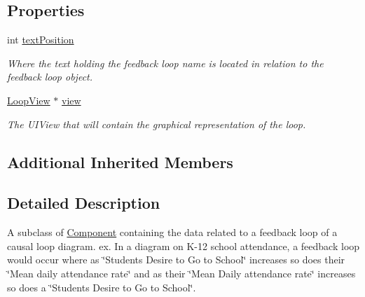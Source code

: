 \subsection*{Properties}
\begin{DoxyCompactItemize}
\item 
\hypertarget{interface_loop_a0e3597199260a059ec632e5d54adb06e}{int \hyperlink{interface_loop_a0e3597199260a059ec632e5d54adb06e}{text\-Position}}\label{interface_loop_a0e3597199260a059ec632e5d54adb06e}

\begin{DoxyCompactList}\small\item\em Where the text holding the feedback loop name is located in relation to the feedback loop object. \end{DoxyCompactList}\item 
\hypertarget{interface_loop_a73b1ecad68943855563486ea8848e95f}{\hyperlink{interface_loop_view}{Loop\-View} $\ast$ \hyperlink{interface_loop_a73b1ecad68943855563486ea8848e95f}{view}}\label{interface_loop_a73b1ecad68943855563486ea8848e95f}

\begin{DoxyCompactList}\small\item\em The U\-I\-View that will contain the graphical representation of the loop. \end{DoxyCompactList}\end{DoxyCompactItemize}
\subsection*{Additional Inherited Members}


\subsection{Detailed Description}
A subclass of \hyperlink{interface_component}{Component} containing the data related to a feedback loop of a causal loop diagram. ex. In a diagram on K-\/12 school attendance, a feedback loop would occur where as \char`\"{}\-Students Desire to Go to School\char`\"{} increases so does their \char`\"{}\-Mean daily attendance rate\char`\"{} and as their \char`\"{}\-Mean Daily attendance rate\char`\"{} increases so does a \char`\"{}\-Students Desire to Go to School\char`\"{}. 

